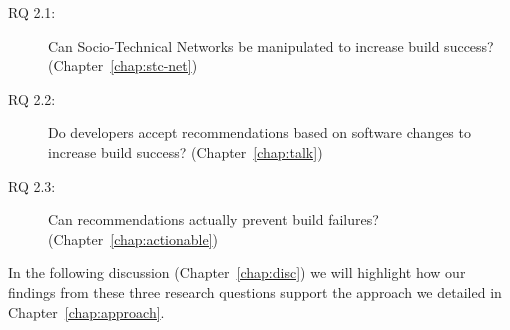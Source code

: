 \begin{description}
  \item[RQ 2.1:] Can Socio-Technical Networks be manipulated to increase build success? (Chapter~\ref{chap:stc-net})
  \item[RQ 2.2:] Do developers accept recommendations based on software changes to increase build success? (Chapter~\ref{chap:talk})
  \item[RQ 2.3:] Can recommendations actually prevent build failures? (Chapter~\ref{chap:actionable})
\end{description}

In the following discussion (Chapter~\ref{chap:disc}) we will highlight how our findings from these three research questions support the approach we detailed in Chapter~\ref{chap:approach}.









